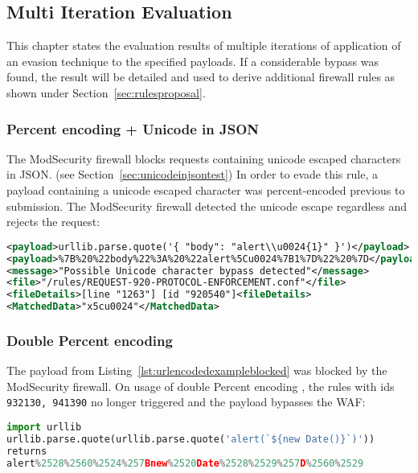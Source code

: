 \subsection{Multi Iteration Evaluation}
\label{sec:multiiteration}
This chapter states the evaluation results of multiple iterations of application of an evasion technique to the specified payloads. If a considerable bypass was found, the result will be detailed and used to derive additional firewall rules as shown under Section~\ref{sec:rulesproposal}.


\subsubsection{Percent encoding + Unicode in JSON}
The ModSecurity firewall blocks requests containing unicode escaped characters in JSON. (see Section~\ref{sec:unicodeinjsontest})
In order to evade this rule, a payload containing a unicode escaped character was percent-encoded previous to submission.
The ModSecurity firewall detected the unicode escape regardless and rejects the request:

\begin{lstlisting}[style=ruleStyle, language=XML, caption=unicode escape in json with additional percent encoding, label={lst:jsonunicodeurlenctest}]
<payload>urllib.parse.quote('{ "body": "alert\\u0024{1}" }')</payload>
<payload>%7B%20%22body%22%3A%20%22alert%5Cu0024%7B1%7D%22%20%7D</payload>
<message>"Possible Unicode character bypass detected"</message>
<file>"/rules/REQUEST-920-PROTOCOL-ENFORCEMENT.conf"</file>
<fileDetails>[line "1263"] [id "920540"]<fileDetails>
<MatchedData>"x5cu0024"</MatchedData>
\end{lstlisting}


\subsubsection{Double Percent encoding}
\label{sec:doublepercenc}
The payload from Listing~\ref{lst:urlencodedexampleblocked} was blocked by the ModSecurity firewall.
On usage of double Percent encoding , the rules with ids \verb|932130, 941390| no longer triggered and the payload bypasses the WAF:

\begin{lstlisting}[style=basicStyle, caption=url encoded example pass, label={lst:doublepercentencoding}, escapeinside=\^\^, language=Python]
import urllib
urllib.parse.quote(urllib.parse.quote('alert(`${new Date()}`)'))
returns
alert%2528%2560%2524%257Bnew%2520Date%2528%2529%257D%2560%2529
\end{lstlisting}

